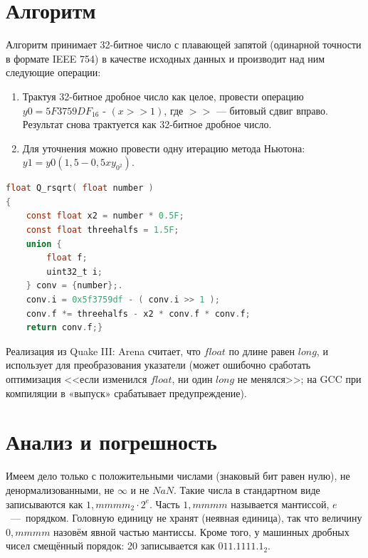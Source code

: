 \documentclass{book}
\begin{document}
 \section*{Алгоритм}
 

 
 Алгоритм принимает 32-битное число с плавающей запятой (одинарной точности в формате IEEE 754) в качестве исходных данных и производит над ним следующие операции:
 \begin{enumerate}
     \item Трактуя 32-битное дробное число как целое, провести операцию $y0 = 5F3759DF_{16}$ - $(x >> 1)$, где $>>$ — битовый сдвиг вправо. Результат снова трактуется как 32-битное дробное число.
     \item Для уточнения можно провести одну итерацию метода Ньютона: $y1 = y0(1,5 - 0,5xy_{0^{2}})$.
 \end{enumerate}
  \begin{lstlisting}[language=C, caption={Реализация на языке С}]  
 float Q_rsqrt( float number )
{	
	const float x2 = number * 0.5F;
	const float threehalfs = 1.5F;
	union {
		float f;
		uint32_t i;
	} conv = {number};.
	conv.i = 0x5f3759df - ( conv.i >> 1 );
	conv.f *= threehalfs - x2 * conv.f * conv.f;
	return conv.f;}
 \end{lstlisting}
 
 Реализация из Quake III: Arena считает, что $float$ по длине равен $long$, и использует для преобразования указатели (может ошибочно сработать оптимизация <<если изменился $float$, ни один $long$ не менялся>>; на GCC при компиляции в «выпуск» срабатывает предупреждение).
 \section*{Анализ и погрешность}
 
Имеем дело только с положительными числами (знаковый бит равен нулю), не денормализованными, не $\infty$ и не $NaN$. Такие числа в стандартном виде записываются как $1,mmmm_{2}·2^{e}$. Часть $1,mmmm$ называется мантиссой, $e$~—~порядком. Головную единицу не хранят (неявная единица), так что величину $0,mmmm$ назовём явной частью мантиссы. Кроме того, у машинных дробных чисел смещённый порядок: 20 записывается как $011.1111.1_{2}$.
\end{document}
